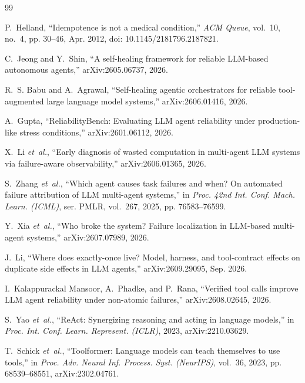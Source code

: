 \documentclass[10pt,journal,compsoc]{IEEEtran}
\begin{document}
\begin{thebibliography}{99}
\footnotesize
\ifieeeclass\else\setlength{\itemsep}{0pt plus 0.3pt}\fi

P.~Helland, ``Idempotence is not a medical condition,'' \emph{ACM Queue}, vol.~10, no.~4, pp. 30--46, Apr. 2012, doi: 10.1145/2181796.2187821.

C.~Jeong and Y.~Shin, ``A self-healing framework for reliable LLM-based autonomous agents,'' arXiv:2605.06737, 2026.

R.~S. Babu and A.~Agrawal, ``Self-healing agentic orchestrators for reliable tool-augmented large language model systems,'' arXiv:2606.01416, 2026.

A.~Gupta, ``ReliabilityBench: Evaluating LLM agent reliability under production-like stress conditions,'' arXiv:2601.06112, 2026.

X.~Li \emph{et~al.}, ``Early diagnosis of wasted computation in multi-agent LLM systems via failure-aware observability,'' arXiv:2606.01365, 2026.

S.~Zhang \emph{et~al.}, ``Which agent causes task failures and when? On automated failure attribution of LLM multi-agent systems,'' in \emph{Proc. 42nd Int. Conf. Mach. Learn. (ICML)}, ser. PMLR, vol.~267, 2025, pp. 76583--76599.

Y.~Xia \emph{et~al.}, ``Who broke the system? Failure localization in LLM-based multi-agent systems,'' arXiv:2607.07989, 2026.

J.~Li, ``Where does exactly-once live? Model, harness, and tool-contract effects on duplicate side effects in LLM agents,'' arXiv:2609.29095, Sep. 2026.

I.~Kalappurackal Mansoor, A.~Phadke, and P.~Rana, ``Verified tool calls improve LLM agent reliability under non-atomic failures,'' arXiv:2608.02645, 2026.

S.~Yao \emph{et~al.}, ``ReAct: Synergizing reasoning and acting in language models,'' in \emph{Proc. Int. Conf. Learn. Represent. (ICLR)}, 2023, arXiv:2210.03629.

T.~Schick \emph{et~al.}, ``Toolformer: Language models can teach themselves to use tools,'' in \emph{Proc. Adv. Neural Inf. Process. Syst. (NeurIPS)}, vol.~36, 2023, pp. 68539--68551, arXiv:2302.04761.


\end{thebibliography}
\end{document}
